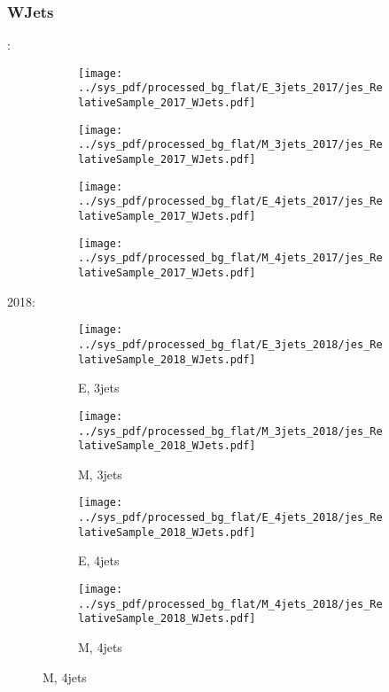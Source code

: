 \documentclass{beamer}
\begin{document}
\begin{frame}
\frametitle{WJets}
\fontsize{5}{1}:
\begin{figure}
\centering
\begin{subfigure}[b]{0.24\textwidth}
\texttt{[image: ../sys\_pdf/processed\_bg\_flat/E\_3jets\_2017/jes\_RelativeSample\_2017\_WJets.pdf]}
\end{subfigure}
\begin{subfigure}[b]{0.24\textwidth}
\texttt{[image: ../sys\_pdf/processed\_bg\_flat/M\_3jets\_2017/jes\_RelativeSample\_2017\_WJets.pdf]}
\end{subfigure}
\begin{subfigure}[b]{0.24\textwidth}
\texttt{[image: ../sys\_pdf/processed\_bg\_flat/E\_4jets\_2017/jes\_RelativeSample\_2017\_WJets.pdf]}
\end{subfigure}
\begin{subfigure}[b]{0.24\textwidth}
\texttt{[image: ../sys\_pdf/processed\_bg\_flat/M\_4jets\_2017/jes\_RelativeSample\_2017\_WJets.pdf]}
\end{subfigure}
\end{figure}
2018:
\begin{figure}
\centering
\begin{subfigure}[b]{0.24\textwidth}
\texttt{[image: ../sys\_pdf/processed\_bg\_flat/E\_3jets\_2018/jes\_RelativeSample\_2018\_WJets.pdf]}
\captionsetup{font=tiny}
\caption{E, 3jets}
\end{subfigure}
\begin{subfigure}[b]{0.24\textwidth}
\texttt{[image: ../sys\_pdf/processed\_bg\_flat/M\_3jets\_2018/jes\_RelativeSample\_2018\_WJets.pdf]}
\captionsetup{font=tiny}
\caption{M, 3jets}
\end{subfigure}
\begin{subfigure}[b]{0.24\textwidth}
\texttt{[image: ../sys\_pdf/processed\_bg\_flat/E\_4jets\_2018/jes\_RelativeSample\_2018\_WJets.pdf]}
\captionsetup{font=tiny}
\caption{E, 4jets}
\end{subfigure}
\begin{subfigure}[b]{0.24\textwidth}
\texttt{[image: ../sys\_pdf/processed\_bg\_flat/M\_4jets\_2018/jes\_RelativeSample\_2018\_WJets.pdf]}
\captionsetup{font=tiny}
\caption{M, 4jets}
\end{subfigure}
\end{figure}
\end{frame}
\end{document}
